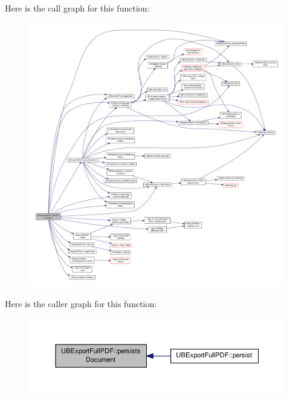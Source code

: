 Here is the call graph for this function\-:
\nopagebreak
\begin{figure}[H]
\begin{center}
\leavevmode
\includegraphics[width=350pt]{d6/d54/class_u_b_export_full_p_d_f_a2101b6fdc6ed273a6e2c062d5ce7e12c_cgraph}
\end{center}
\end{figure}




Here is the caller graph for this function\-:
\nopagebreak
\begin{figure}[H]
\begin{center}
\leavevmode
\includegraphics[width=350pt]{d6/d54/class_u_b_export_full_p_d_f_a2101b6fdc6ed273a6e2c062d5ce7e12c_icgraph}
\end{center}
\end{figure}


